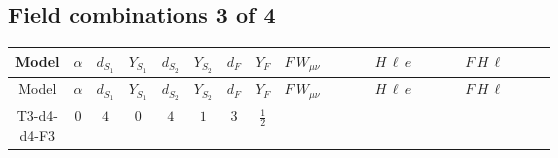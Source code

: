 \documentclass[8pt]{article}
\begin{document}
\begin{landscape}
\subsection*{Field combinations 3 of 4}
\begin{longtable}{@{}cccccccc >{\raggedright\arraybackslash}p{0.21\linewidth} >{\raggedright\arraybackslash}p{0.21\linewidth} >{\raggedright\arraybackslash}p{0.21\linewidth}@{}}
\toprule
Model & $\alpha$ & $d_{S_1}$ & $Y_{S_1}$ & $d_{S_2}$ & $Y_{S_2}$ & $d_F$ & $Y_F$ & $F\,W_{\mu\nu}$ & $H\,\ell\,e$ & $F\,H\,\ell$ \\
\midrule
\endfirsthead
\toprule
Model & $\alpha$ & $d_{S_1}$ & $Y_{S_1}$ & $d_{S_2}$ & $Y_{S_2}$ & $d_F$ & $Y_F$ & $F\,W_{\mu\nu}$ & $H\,\ell\,e$ & $F\,H\,\ell$ \\
\midrule
\endhead
T3-d4-d4-F3 & $0$ & $4$ & $0$ & $4$ & $1$ & $3$ & $\frac{1}{2}$ & \scriptsize\adjustbox{max width=\linewidth}{$\begin{gathered} -2 \hbar  \log \left(\frac{\bar{\mu}^{2}}{M_F^2}\right) \left(W_{\mu _1\mu _2}^{A_1}\right){}^2\end{gathered}$} & \scriptsize\adjustbox{max width=\linewidth}{$\begin{gathered} +\frac{\sqrt{\frac{3}{2}} \hbar  \overline{y_{1,i_3,r_1}} \overline{L_{a_1,i_2}}\, P_R\, e_{i_1} H_{a_1} y_{1,i_2,r_1} Y_{e,i_3,i_1}}{2 \epsilon } \\ -\frac{1}{4} \sqrt{\frac{3}{2}} \hbar  \overline{y_{1,i_3,r_1}} \overline{L_{a_1,i_2}}\, P_R\, e_{i_1} H_{a_1} y_{1,i_2,r_1} Y_{e,i_3,i_1} \\ +\frac{\sqrt{\frac{3}{2}} \hbar  \overline{y_{2,i_3,r_1}} \overline{L_{a_1,i_2}}\, P_R\, e_{i_1} H_{a_1} y_{2,i_2,r_1} Y_{e,i_3,i_1}}{2 \epsilon }\end{gathered}$} & \scriptsize\adjustbox{max width=\linewidth}{$\begin{gathered} +\frac{2 \sqrt{10} \hbar  \log \left(\frac{M_F^2}{m_2^2}\right) \overline{y_{1,i_1,r_1}} \overline{y_{2,i_2,r_1}} L_{a_4,i_2}{}^T\, C\, P_L\, L_{a_2,i_1} H_{a_1} H_{a_3} m_2^2 \lambda_5 \epsilon_{a_1,a_2} \epsilon_{a_3,a_4} M_F^3}{3 \left(M_F^2-m_1^2\right) \left(M_F^2-m_2^2\right) \left(m_1^2-m_2^2\right)} \\ -\frac{2 \sqrt{10} \hbar  \log \left(\frac{M_F^2}{m_1^2}\right) \overline{y_{1,i_1,r_1}} \overline{y_{2,i_2,r_1}} L_{a_4,i_2}{}^T\, C\, P_L\, L_{a_2,i_1} H_{a_1} H_{a_3} m_1^2 \lambda_5 \epsilon_{a_1,a_2} \epsilon_{a_3,a_4} M_F^3}{3 \left(M_F^2-m_1^2\right) \left(M_F^2-m_2^2\right) \left(m_1^2-m_2^2\right)} \\ +\frac{2 \sqrt{10} \hbar  \log \left(\frac{M_F^2}{m_2^2}\right) \overline{\lambda_5} \overline{L_{a_3,i_1}}\, C\, P_R\, \overline{L_{a_4,i_2}}{}^T m_2^2 y_{1,i_1,r_1} y_{2,i_2,r_1} \epsilon_{a_1,a_3} \epsilon_{a_2,a_4} H_{a_1}{}^{\dagger } H_{a_2}{}^{\dagger } M_F^3}{3 \left(M_F^2-m_1^2\right) \left(M_F^2-m_2^2\right) \left(m_1^2-m_2^2\right)}\end{gathered}$} \\

\end{longtable}
\end{landscape}
\end{document}
